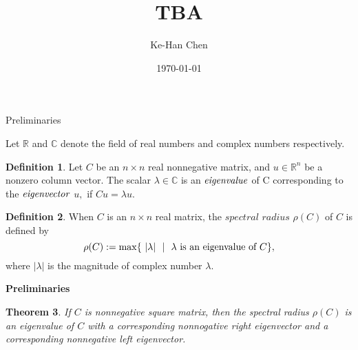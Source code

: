 \documentclass{beamer}
\theoremstyle{plain}
\newtheorem{thm}{Theorem}[section]
\theoremstyle{definition}
\newtheorem{defn}[thm]{Definition}
\begin{document}
\title[]{TBA}
\author[]{Ke-Han Chen} %
\date{\today} %

\begin{frame}
    \maketitle
\end{frame}

\begin{frame}{Preliminaries}
    

    Let $\mathbb{R}$ and $\mathbb{C}$ denote the field of real numbers and complex numbers respectively.
    \begin{defn}
        Let $C$ be an $n \times n$ real nonnegative matrix, and $u \in \mathbb{R}^n$ be a nonzero column vector. The scalar $\lambda \in \mathbb{C}$ is an $\it{eigenvalue}$ of C corresponding to the $\it{eigenvector}$ $u,$  if $Cu = \lambda u.$
    \end{defn}
    \begin{defn}
        When $C$ is an $n \times n$ real matrix, the $\textit {spectral radius} $ $\rho(C)$ of $C$ is defined by
        $$\rho(C):=\max\{~|\lambda|~\ |~~\lambda\hbox{ is an eigenvalue of $C$}\},$$
        where $|\lambda|$ is the magnitude of complex number $\lambda.$
    \end{defn}
\end{frame}

\begin{frame}{\bf Preliminaries}
    \begin{thm} 
        If $C$ is nonnegative square matrix, then the spectral radius $\rho(C)$ is an eigenvalue of $C$ with a corresponding nonnogative right eigenvector and a corresponding nonnegative left eigenvector.
    \end{thm}
\end{frame}
\end{document}
